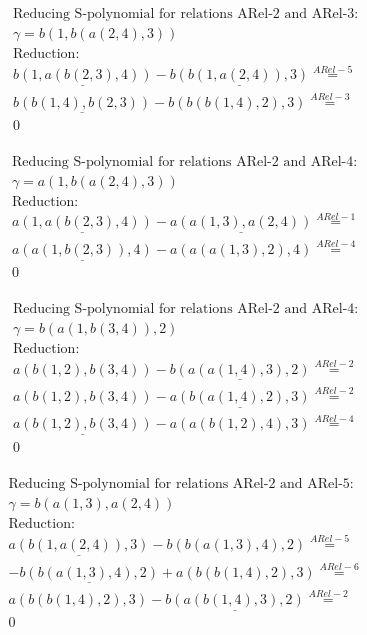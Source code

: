 \documentclass[11pt]{amsart}
\begin{document}
\begin{align*} 
& \text{Reducing S-polynomial for relations ARel-2 and ARel-3:} \\ 
& \gamma = b(1,b(a(2,4),3)) \\ 
& \text{Reduction}: \\&\underline{b(1,a(b(2,3),4))} - \underline{b(b(1,a(2,4)),3)} \stackrel{ ARel-5 }{=}  \\ 
&\underline{b(b(1,4),b(2,3))} - b(b(b(1,4),2),3) \stackrel{ ARel-3 }{=}  \\ 
&0\\ 
\end{align*} 
 
\begin{align*} 
& \text{Reducing S-polynomial for relations ARel-2 and ARel-4:} \\ 
& \gamma = a(1,b(a(2,4),3)) \\ 
& \text{Reduction}: \\&\underline{a(1,a(b(2,3),4))} - \underline{a(a(1,3),a(2,4))} \stackrel{ ARel-1 }{=}  \\ 
&\underline{a(a(1,b(2,3)),4)} - a(a(a(1,3),2),4) \stackrel{ ARel-4 }{=}  \\ 
&0\\ 
\end{align*} 
 
\begin{align*} 
& \text{Reducing S-polynomial for relations ARel-2 and ARel-4:} \\ 
& \gamma = b(a(1,b(3,4)),2) \\ 
& \text{Reduction}: \\&a(b(1,2),b(3,4)) - \underline{b(a(a(1,4),3),2)} \stackrel{ ARel-2 }{=}  \\ 
&a(b(1,2),b(3,4)) - \underline{a(b(a(1,4),2),3)} \stackrel{ ARel-2 }{=}  \\ 
&\underline{a(b(1,2),b(3,4))} - a(a(b(1,2),4),3) \stackrel{ ARel-4 }{=}  \\ 
&0\\ 
\end{align*} 
 
\begin{align*} 
& \text{Reducing S-polynomial for relations ARel-2 and ARel-5:} \\ 
& \gamma = b(a(1,3),a(2,4)) \\ 
& \text{Reduction}: \\&\underline{a(b(1,a(2,4)),3)} - b(b(a(1,3),4),2) \stackrel{ ARel-5 }{=}  \\ 
& - \underline{b(b(a(1,3),4),2)} + a(b(b(1,4),2),3) \stackrel{ ARel-6 }{=}  \\ 
&a(b(b(1,4),2),3) - \underline{b(a(b(1,4),3),2)} \stackrel{ ARel-2 }{=}  \\ 
&0\\ 
\end{align*} 
 
\end{document}
